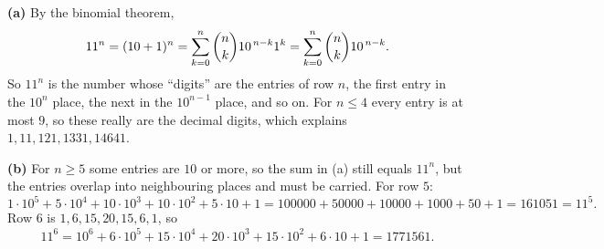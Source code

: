 \textbf{(a)} By the binomial theorem,
\[11^n=(10+1)^n=\sum_{k=0}^n\dbinom nk10^{\,n-k}1^k=\sum_{k=0}^n\dbinom nk10^{\,n-k}.\]
So $11^n$ is the number whose ``digits'' are the entries of row $n$, the first entry in the $10^n$ place, the next in the $10^{n-1}$ place, and so on. For $n\le4$ every entry is at most $9$, so these really are the decimal digits, which explains $1,11,121,1331,14641$.

\textbf{(b)} For $n\ge5$ some entries are $10$ or more, so the sum in (a) still equals $11^n$, but the entries overlap into neighbouring places and must be carried. For row $5$:
\[1\cdot10^5+5\cdot10^4+10\cdot10^3+10\cdot10^2+5\cdot10+1=100000+50000+10000+1000+50+1=161051=11^5.\]
Row $6$ is $1,6,15,20,15,6,1$, so
\[11^6=10^6+6\cdot10^5+15\cdot10^4+20\cdot10^3+15\cdot10^2+6\cdot10+1=\boxed{1771561}.\]
